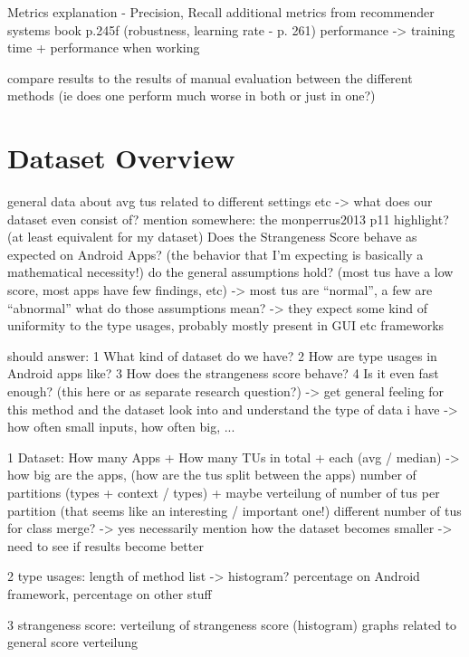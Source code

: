 Metrics explanation - Precision, Recall
    additional metrics from recommender systems book p.245f (robustness, learning rate - p. 261)
    performance -> training time + performance when working

compare results to the results of manual evaluation between the different methods (ie does one perform much worse in both or just in one?)

\section{Dataset Overview}

general data about avg tus related to different settings etc -> what does our dataset even consist of?
mention somewhere: the monperrus2013 p11 highlight? (at least equivalent for my dataset)
Does the Strangeness Score behave as expected on Android Apps? (the behavior that I'm expecting is basically a mathematical necessity!)
    do the general assumptions hold? (most tus have a low score, most apps have few findings, etc)
        -> most tus are ``normal'', a few are ``abnormal''
        what do those assumptions mean? -> they expect some kind of uniformity to the type usages, probably mostly present in GUI etc frameworks

should answer:
    1 What kind of dataset do we have?
    2 How are type usages in Android apps like?
    3 How does the strangeness score behave?
    4 Is it even fast enough? (this here or as separate research question?)
-> get general feeling for this method and the dataset
look into and understand the type of data i have -> how often small inputs, how often big, ...

1 Dataset:
    How many Apps + How many TUs in total + each (avg / median) -> how big are the apps, (how are the tus split between the apps)
    number of partitions (types + context / types) + maybe verteilung of number of tus per partition (that seems like an interesting / important one!)
    different number of tus for class merge? -> yes necessarily
        mention how the dataset becomes smaller -> need to see if results become better

2 type usages:
    length of method list -> histogram?
    percentage on Android framework, percentage on other stuff

3 strangeness score:
    verteilung of strangeness score (histogram)
    graphs related to general score verteilung

